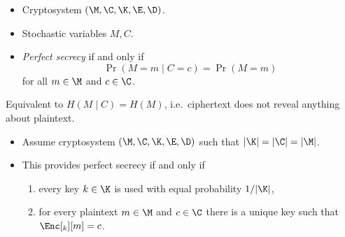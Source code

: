 \begin{frame}
  \begin{definition}
    \begin{itemize}
      \item Cryptosystem \((\M, \C, \K, \E, \D)\).
      \item Stochastic variables \(M, C\).
      \item \emph{Perfect secrecy} if and only if \[\Pr(M = m\mid C = c) 
          = \Pr(M = m)\] for all \(m\in \M\) and \(c\in \C\).
    \end{itemize}
  \end{definition}

  \pause{}

  \begin{remark}
    Equivalent to \(H(M\mid C) = H(M)\), i.e.\ ciphertext does not reveal 
    anything about plaintext.
  \end{remark}
\end{frame}

\begin{frame}
  \begin{theorem}
    \begin{itemize}
      \item Assume cryptosystem \((\M, \C, \K, \E, \D)\) such that \(|\K| 
          = |\C| = |\M|\).

        \pause{}

      \item This provides perfect secrecy if and only if
        \begin{enumerate}
          \item every key \(k\in \K\) is used with equal probability 
            \(1/|\K|\),
          \item for every plaintext \(m\in \M\) and \(c\in \C\) there is a 
            unique key such that \(\Enc[_k][m] = c\).
        \end{enumerate}
    \end{itemize}
  \end{theorem}
\end{frame}

